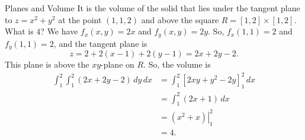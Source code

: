 \documentclass{article}
\begin{document}
\begin{final}{Planes and Volume}
  It is the volume of the solid that lies under the tangent plane to $z=x^2+y^2$ at the point $(1,1,2)$ and above the square $R=[1,2]\times[1,2]$.
\response
  What is $4$?
\solution
  We have $f_x(x,y)=2x$ and $f_y(x,y)=2y$. So, $f_x(1,1)=2$ and $f_y(1,1)=2$, and the tangent plane is
  \[
  z=2+2(x-1)+2(y-1)=2x+2y-2.
  \]
  This plane is above the $xy$-plane on $R$. So, the volume is
  \begin{align*}
  \int_1^2\int_1^2(2x+2y-2)\,dy\,dx
  &=\int_1^2\left[2xy+y^2-2y\right]_1^2\,dx \\
  &=\int_1^2(2x+1)\,dx \\
  &=\left.\left(x^2+x\right)\right|_1^2 \\
  &=4.
  \end{align*}
\end{final}
\end{document}
